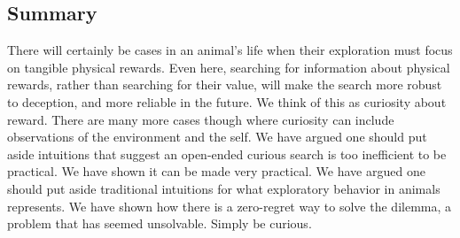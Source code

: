 \subsection*{Summary}
There will certainly be cases in an animal's life when their exploration must focus on tangible physical rewards. Even here, searching for information about physical rewards, rather than searching for their value, will make the search more robust to deception, and more reliable in the future. We think of this as curiosity about reward. There are many more cases though where curiosity can include observations of the environment and the self. We have argued one should put aside intuitions that suggest an open-ended curious search is too inefficient to be practical. We have shown it can be made very practical. We have argued one should put aside traditional intuitions for what exploratory behavior in animals represents. We have shown how there is a zero-regret way to solve the dilemma, a problem that has seemed unsolvable. Simply be curious.



